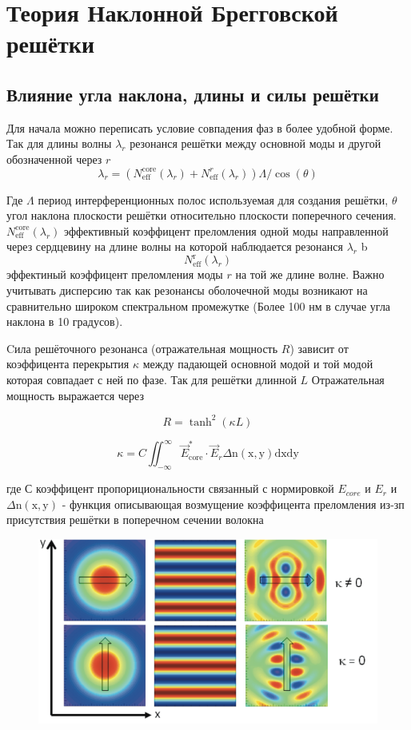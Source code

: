 \section{Теория Наклонной Брегговской решётки}
\subsection{Влияние угла наклона, длины и силы решётки}
 Для начала можно  переписать условие совпадения фаз в более удобной форме.
 Так для длины волны $ \lambda_{r} $ резонанся решётки между основной моды и другой обозначенной через $ r $
$$\lambda_{r}=\left(N_{\mathrm{eff}}^{\mathrm{core}}\left(\lambda_{r}\right)+N_{\mathrm{eff}}^{r}\left(\lambda_{r}\right)\right) \Lambda / \cos (\theta)$$

 Где $ \Lambda $ период интерференционных полос используемая для создания решётки, $ \theta $ угол наклона плоскости решётки относительно плоскости поперечного сечения.
 $N_{\mathrm{eff}}^{\mathrm{core}}\left(\lambda_{r}\right)$ эффективный коэффицент преломления одной моды направленной через сердцевину на длине волны на которой наблюдается резонанся $ \lambda_{r} $ b $$N_{\mathrm{eff}}^{\mathrm{r}}\left(\lambda_{r}\right)$$ эффектиный коэффицент преломления моды $ r $ на той же длине волне. Важно учитывать дисперсию так как резонансы оболочечной моды возникают на сравнительно широком спектральном промежутке (Более 100 нм в случае угла наклона в 10 градусов).
 
\par
Cила решёточного резонанса (отражательная мощность $ R $) зависит от коэффицента перекрытия $ \kappa $ между 
падающей основной модой и той модой которая совпадает с ней по фазе.
Так для решётки длинной $ L $ Отражательная мощность выражается через




$$R=\tanh ^{2}(\kappa L)$$


$$\kappa=C \iint_{-\infty}^{\infty} \vec{E}_{\mathrm{core}}^{*} \cdot \vec{E}_{r} \Delta \mathrm{n}(\mathrm{x}, \mathrm{y}) \mathrm{d} \mathrm{xdy}$$


где $ С $ коэффицент пропорициональности связанный с нормировкой $ E_{core} $ и $ E_{r}$ и  $\Delta \mathrm{n}(\mathrm{x}, \mathrm{y})$ - функция описывающая возмущение коэффицента преломления из-зп присутствия решётки в поперечном сечении волокна
 
 \begin{figure}[h]
 	\centering
 	\includegraphics[width=0.7\linewidth]{screenshot008}
 	\caption{}
 	\label{fig:screenshot008}
 \end{figure}
 